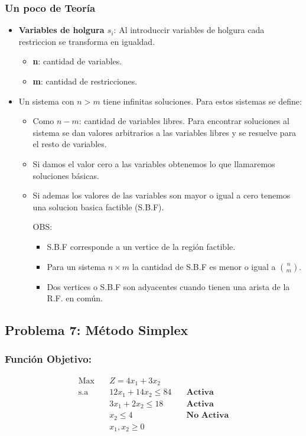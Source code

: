 \documentclass{templateNote}
\begin{document}
\subsubsection*{Un poco de Teoría}
\begin{itemize}
    \item \textbf{Variables de holgura $s_i$}: Al introduccir variables de holgura cada restriccion se transforma en igualdad.
    \begin{itemize}
        \item \textbf{n}: cantidad de variables.
        \item \textbf{m}: cantidad de restricciones.
    \end{itemize}

    \item Un sistema con $n>m$ tiene infinitas soluciones.
    Para estos sistemas se define:
    \begin{itemize}
        \item Como $n-m$: cantidad de variables libres. Para encontrar soluciones al sistema se dan valores arbitrarios a las variables libres y se resuelve para el resto de variables.
        
        \item Si damos el valor cero a las variables obtenemos lo que llamaremos soluciones básicas.
        
        \item Si ademas los valores de las variables son mayor o igual a cero tenemos una solucion basica factible (S.B.F).
        
        OBS:
        \begin{itemize}
            \item S.B.F corresponde a un vertice de la región factible.
            \item Para un sistema $n \times m$ la cantidad de S.B.F es menor o igual a $\binom{n}{m} $.
            \item Dos vertices o S.B.F son adyacentes cuando tienen una arista de la R.F. en común.
        \end{itemize}
    \end{itemize}
\end{itemize}
\newpage
\subsection*{Problema 7: Método Simplex}
\subsubsection*{Función Objetivo:}
\begin{equation*}
    \begin{aligned}
        \text{Max} \quad & Z = 4x_1 + 3x_2 \\
        \text{s.a} \quad & 12x_1 + 14x_2 \leq 84 \quad & \textbf{Activa} \\
        & 3x_1 + 2x_2 \leq 18 \quad & \textbf{Activa} \\
        & x_2 \leq 4 \quad & \textbf{No Activa} \\
        & x_1, x_2 \geq 0
    \end{aligned}
\end{equation*}
\end{document}

